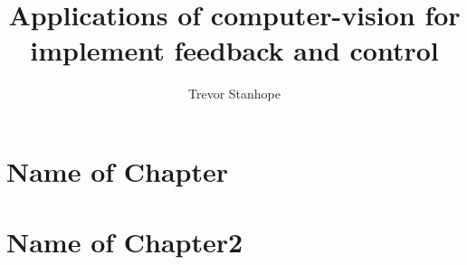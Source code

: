 \documentclass{report}
\begin{document}
\title{Applications of computer-vision for implement feedback and
  control}
\author{Trevor Stanhope}
\maketitle

\chapter{Name of Chapter}

\chapter{Name of Chapter2}


\nocite{*}
\printbibliography
\end{document}
